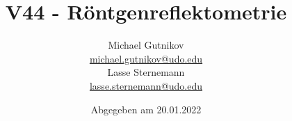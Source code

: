 


\title{V44 - Röntgenreflektometrie}
\author{
  Michael Gutnikov\\
  \href{mailto:michael.gutnikov@udo.edu}{michael.gutnikov@udo.edu}\\
  Lasse Sternemann\\
  \href{mailto:lasse.sternemann@udo.edu}{lasse.sternemann@udo.edu}
}
\date{Abgegeben am 20.01.2022}


    \maketitle
    \newpage
    \tableofcontents
    \newpage

    
    
    
    
    


    \newpage
    \printbibliography

